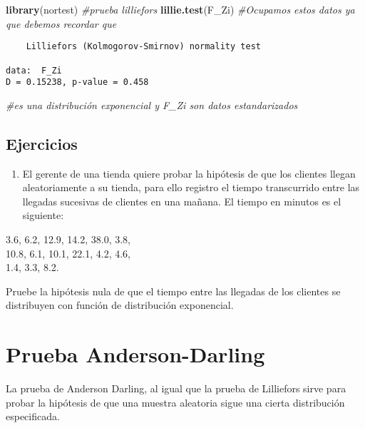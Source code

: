 \documentclass[
  a4paper,
  oneside,
  openany]{book}
\newenvironment{Shaded}{\begin{snugshade}}{\end{snugshade}}
\newcommand{\CommentTok}[1]{\textcolor[rgb]{0.56,0.35,0.01}{\textit{#1}}}
\newcommand{\KeywordTok}[1]{\textcolor[rgb]{0.13,0.29,0.53}{\textbf{#1}}}
\newcommand{\NormalTok}[1]{#1}
\providecommand{\tightlist}{%
  \setlength{\itemsep}{0pt}\setlength{\parskip}{0pt}}
\begin{document}
\begin{Shaded}
\begin{Highlighting}[]
\KeywordTok{library}\NormalTok{(nortest) }\CommentTok{\#prueba lilliefors}
\KeywordTok{lillie.test}\NormalTok{(F\_Zi) }\CommentTok{\#Ocupamos estos datos ya que debemos recordar que }
\end{Highlighting}
\end{Shaded}

\begin{verbatim}
    Lilliefors (Kolmogorov-Smirnov) normality test

data:  F_Zi
D = 0.15238, p-value = 0.458
\end{verbatim}

\begin{Shaded}
\begin{Highlighting}[]
                   \CommentTok{\#es una distribución exponencial y F\_Zi son datos estandarizados }
\end{Highlighting}
\end{Shaded}

\hypertarget{ejercicios-12}{%
\section{Ejercicios}\label{ejercicios-12}}

\begin{enumerate}
\def\labelenumi{\arabic{enumi}.}
\tightlist
\item
  El gerente de una tienda quiere probar la hipótesis de que los clientes llegan aleatoriamente a su tienda, para ello registro el tiempo transcurrido entre las llegadas sucesivas de clientes en una mañana. El tiempo en minutos es el siguiente:
\end{enumerate}

3.6, 6.2, 12.9, 14.2, 38.0, 3.8,\\
10.8, 6.1, 10.1, 22.1, 4.2, 4.6,\\
1.4, 3.3, 8.2.

Pruebe la hipótesis nula de que el tiempo entre las llegadas de los clientes se distribuyen con función de distribución exponencial.

\hypertarget{prueba-anderson-darling}{%
\chapter{Prueba Anderson-Darling}\label{prueba-anderson-darling}}

La prueba de Anderson Darling, al igual que la prueba de Lilliefors sirve para probar la
hipótesis de que una muestra aleatoria sigue una cierta distribución especificada.
\end{document}
